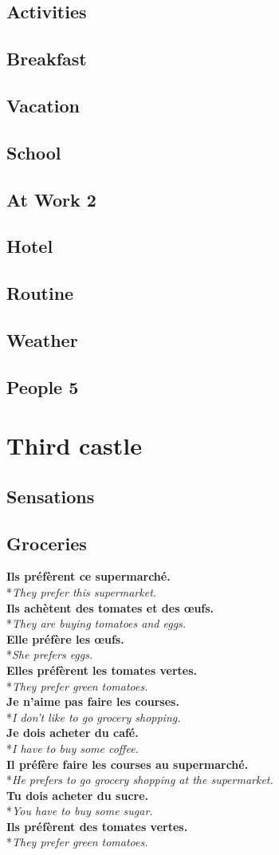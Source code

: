 \documentclass[a4paper,11pt,oneside]{book}
\newcommand{\phrase}[2]{\noindent\textbf{#1}\\*\-\hspace{0.5cm}\textit{#2}\\}
\begin{document}
\section{Activities}
\section{Breakfast}
\section{Vacation}
\section{School}
\section{At Work 2}
\section{Hotel}
\section{Routine}
\section{Weather}
\section{People 5}

\chapter{Third castle}

\section{Sensations}
\section{Groceries}

\phrase{Ils préfèrent ce supermarché.}{They prefer this supermarket.}
\phrase{Ils achètent des tomates et des œufs.}{They are buying tomatoes and eggs.}
\phrase{Elle préfère les œufs.}{She prefers eggs.}
\phrase{Elles préfèrent les tomates vertes.}{They prefer green tomatoes.}
\phrase{Je n'aime pas faire les courses.}{I don't like to go grocery shopping.}
\phrase{Je dois acheter du café.}{I have to buy some coffee.}
\phrase{Il préfère faire les courses au supermarché.}{He prefers to go grocery shopping at the supermarket.}
\phrase{Tu dois acheter du sucre.}{You have to buy some sugar.}
\phrase{Ils préfèrent des tomates vertes.}{They prefer green tomatoes.}
\end{document}
